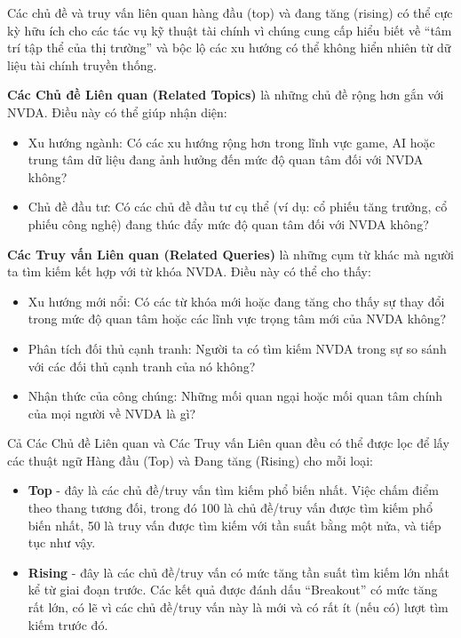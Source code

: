 Các chủ đề và truy vấn liên quan hàng đầu (top) và đang tăng (rising) có thể cực kỳ hữu ích cho các tác vụ kỹ thuật tài chính vì chúng cung cấp hiểu biết về ``tâm trí tập thể của thị trường'' và bộc lộ các xu hướng có thể không hiển nhiên từ dữ liệu tài chính truyền thống.

\textbf{Các Chủ đề Liên quan (Related Topics)} là những chủ đề rộng hơn gắn với NVDA. Điều này có thể giúp nhận diện:
\begin{itemize}
  \item Xu hướng ngành: Có các xu hướng rộng hơn trong lĩnh vực game, AI hoặc trung tâm dữ liệu đang ảnh hưởng đến mức độ quan tâm đối với NVDA không?
  \item Chủ đề đầu tư: Có các chủ đề đầu tư cụ thể (ví dụ: cổ phiếu tăng trưởng, cổ phiếu công nghệ) đang thúc đẩy mức độ quan tâm đối với NVDA không?
\end{itemize}

\textbf{Các Truy vấn Liên quan (Related Queries)} là những cụm từ khác mà người ta tìm kiếm kết hợp với từ khóa NVDA. Điều này có thể cho thấy:
\begin{itemize}
  \item Xu hướng mới nổi: Có các từ khóa mới hoặc đang tăng cho thấy sự thay đổi trong mức độ quan tâm hoặc các lĩnh vực trọng tâm mới của NVDA không?
  \item Phân tích đối thủ cạnh tranh: Người ta có tìm kiếm NVDA trong sự so sánh với các đối thủ cạnh tranh của nó không?
  \item Nhận thức của công chúng: Những mối quan ngại hoặc mối quan tâm chính của mọi người về NVDA là gì?
\end{itemize}

Cả Các Chủ đề Liên quan và Các Truy vấn Liên quan đều có thể được lọc để lấy các thuật ngữ Hàng đầu (Top) và Đang tăng (Rising) cho mỗi loại:

\begin{itemize}
  \item \textbf{Top} - đây là các chủ đề/truy vấn tìm kiếm phổ biến nhất. Việc chấm điểm theo thang tương đối, trong đó 100 là chủ đề/truy vấn được tìm kiếm phổ biến nhất, 50 là truy vấn được tìm kiếm với tần suất bằng một nửa, và tiếp tục như vậy.
  \item \textbf{Rising} - đây là các chủ đề/truy vấn có mức tăng tần suất tìm kiếm lớn nhất kể từ giai đoạn trước. Các kết quả được đánh dấu ``Breakout'' có mức tăng rất lớn, có lẽ vì các chủ đề/truy vấn này là mới và có rất ít (nếu có) lượt tìm kiếm trước đó.
\end{itemize}

